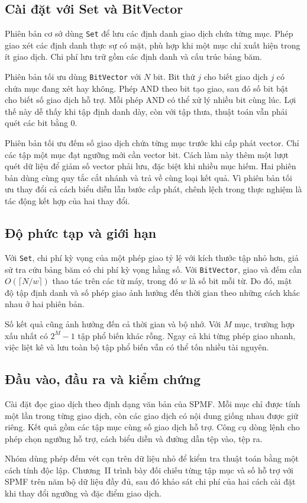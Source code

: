 \subsection{Cài đặt với Set và BitVector}
Phiên bản cơ sở dùng \texttt{Set} để lưu các định danh giao dịch chứa
từng mục. Phép giao xét các định danh thực sự có mặt, phù hợp khi một
mục chỉ xuất hiện trong ít giao dịch. Chi phí lưu trữ gồm các định danh
và cấu trúc bảng băm.

Phiên bản tối ưu dùng \texttt{BitVector} với $N$ bit. Bit thứ $j$ cho
biết giao dịch $j$ có chứa mục đang xét hay không. Phép AND theo bit
tạo giao, sau đó số bit bật cho biết số giao dịch hỗ trợ. Mỗi phép AND
có thể xử lý nhiều bit cùng lúc. Lợi thế này dễ thấy khi tập định danh
dày, còn với tập thưa, thuật toán vẫn phải quét các bit bằng 0.

Phiên bản tối ưu đếm số giao dịch chứa từng mục trước khi cấp phát
vector. Chỉ các tập một mục đạt ngưỡng mới cần vector bit. Cách làm
này thêm một lượt quét dữ liệu để giảm số vector phải lưu, đặc biệt
khi nhiều mục hiếm. Hai phiên bản dùng cùng quy tắc cắt nhánh và trả
về cùng loại kết quả. Vì phiên bản tối ưu thay đổi cả cách biểu diễn
lẫn bước cấp phát, chênh lệch trong thực nghiệm là tác động kết hợp
của hai thay đổi.

\subsection{Độ phức tạp và giới hạn}
Với \texttt{Set}, chi phí kỳ vọng của một phép giao tỷ lệ với kích
thước tập nhỏ hơn, giả sử tra cứu bảng băm có chi phí kỳ vọng hằng số.
Với \texttt{BitVector}, giao và đếm cần $O(\lceil N/w\rceil)$ thao tác
trên các từ máy, trong đó $w$ là số bit mỗi từ. Do đó, mật độ tập định
danh và số phép giao ảnh hưởng đến thời gian theo những cách khác nhau
ở hai phiên bản.

Số kết quả cũng ảnh hưởng đến cả thời gian và bộ nhớ. Với $M$ mục,
trường hợp xấu nhất có $2^M-1$ tập phổ biến khác rỗng. Ngay cả khi từng
phép giao nhanh, việc liệt kê và lưu toàn bộ tập phổ biến vẫn có thể
tốn nhiều tài nguyên.

\subsection{Đầu vào, đầu ra và kiểm chứng}
Cài đặt đọc giao dịch theo định dạng văn bản của SPMF. Mỗi mục chỉ
được tính một lần trong từng giao dịch, còn các giao dịch có nội dung
giống nhau được giữ riêng. Kết quả gồm các tập mục cùng số giao dịch
hỗ trợ. Công cụ dòng lệnh cho phép chọn ngưỡng hỗ trợ, cách biểu diễn
và đường dẫn tệp vào, tệp ra.

Nhóm dùng phép đếm vét cạn trên dữ liệu nhỏ để kiểm tra thuật toán
bằng một cách tính độc lập. Chương~II trình bày đối chiếu từng tập mục
và số hỗ trợ với SPMF trên năm bộ dữ liệu đầy đủ, sau đó khảo sát chi
phí của hai cách cài đặt khi thay đổi ngưỡng và đặc điểm giao dịch.
